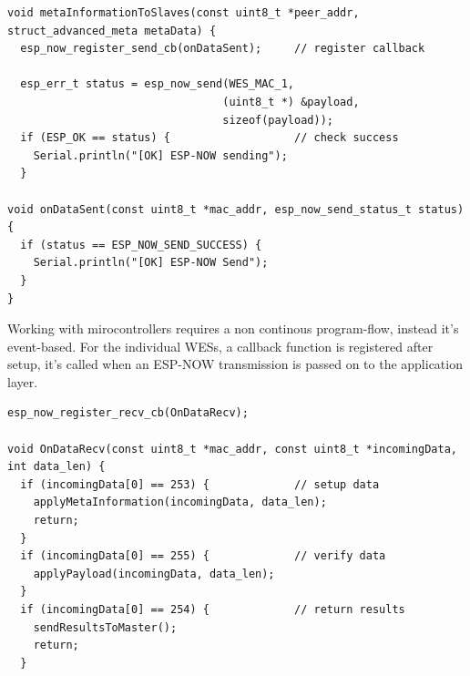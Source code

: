 \begin{lstlisting}[caption=Send ESP-NOW Cast UC/BC]
void metaInformationToSlaves(const uint8_t *peer_addr, struct_advanced_meta metaData) {
  esp_now_register_send_cb(onDataSent);     // register callback

  esp_err_t status = esp_now_send(WES_MAC_1,
                                 (uint8_t *) &payload,
                                 sizeof(payload));
  if (ESP_OK == status) {                   // check success
    Serial.println("[OK] ESP-NOW sending"); 
  }

void onDataSent(const uint8_t *mac_addr, esp_now_send_status_t status) {
  if (status == ESP_NOW_SEND_SUCCESS) {
    Serial.println("[OK] ESP-NOW Send"); 
  }
}
\end{lstlisting}
\label{lst:sendcast}

Working with mirocontrollers requires a non continous program-flow, instead it's event-based.
For the individual WESs, a callback function is registered after setup, 
it's called when an ESP-NOW transmission is passed on to the application layer.

\begin{lstlisting}[caption=ESP-NOW Callback Functions]
esp_now_register_recv_cb(OnDataRecv);

void OnDataRecv(const uint8_t *mac_addr, const uint8_t *incomingData, int data_len) {
  if (incomingData[0] == 253) {             // setup data
    applyMetaInformation(incomingData, data_len);
    return;
  }
  if (incomingData[0] == 255) {             // verify data
    applyPayload(incomingData, data_len);
  }
  if (incomingData[0] == 254) {             // return results
    sendResultsToMaster();
    return;
  }
\end{lstlisting}
\label{lst:callback}
